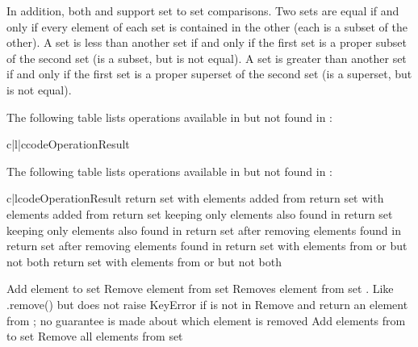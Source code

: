 In addition, both  and 
support set to set comparisons.  Two sets are equal if and only if
every element of each set is contained in the other (each is a subset
of the other).
A set is less than another set if and only if the first set is a proper
subset of the second set (is a subset, but is not equal).
A set is greater than another set if and only if the first set is a proper
superset of the second set (is a superset, but is not equal).

The following table lists operations available in 
but not found in :

\begin{tableii}{c|l|c}{code}{Operation}{Result}
\end{tableii}

The following table lists operations available in 
but not found in :

\begin{tableii}{c|l}{code}{Operation}{Result}
         {return set  with elements added from }
         {return set  with elements added from }
         {return set  keeping only elements also found in }
         {return set  keeping only elements also found in }
         {return set  after removing elements found in }
         {return set  after removing elements found in }
         {return set  with elements from  or 
          but not both}
         {return set  with elements from  or 
          but not both}

  \hline
         {Add element  to set }
         {Remove element  from set }
         {Removes element  from set . Like .remove()
          but does not raise KeyError if  is not in }
         {Remove and return an element from ; no guarantee is
          made about which element is removed}
         {Add elements from  to set }
         {Remove all elements from set }
\end{tableii}


